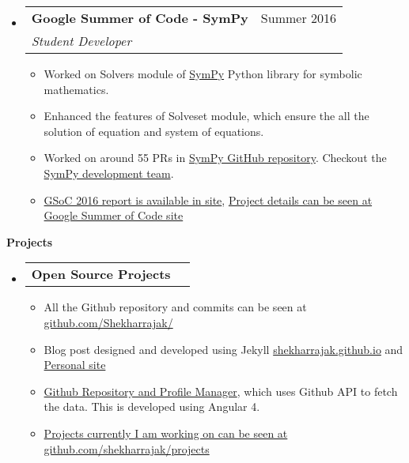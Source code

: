 \documentclass[letterpaper,12pt]{article}[leftmargin=*]
\makeatletter
\def \entryspacing {-0pt}
\renewcommand{\section}[2]{\vspace{5pt}
  \colorbox{secondary}{\color{white}\raggedbottom\normalsize\textbf{{#1}{\hspace{7pt}#2}}}
}
\newcommand{\resumeEntryStart}{\begin{itemize}[leftmargin=2.5mm]}
\newcommand{\resumeEntryEnd}{\end{itemize}\vspace{\entryspacing}}
\newcommand{\resumeItemListStart}{\begin{itemize}[leftmargin=4.5mm]}
\newcommand{\resumeItemListEnd}{\end{itemize}}
\newcommand{\resumeItem}[1]{
  \item\small{
    {#1 \vspace{-2pt}}
  }
}
\newcommand{\resumeEntryTSDL}[4]{
  \vspace{-1pt}\item[]
    \begin{tabular*}{0.97\textwidth}{l@{\extracolsep{\fill}}r}
      \textbf{\color{primary}#1} & {\firabook\color{accent}\small#2} \\
      \textit{\color{accent}\small#3} & \textit{\color{accent}\small#4} \\
    \end{tabular*}\vspace{-6pt}
}
\newcommand{\resumeEntryTD}[2]{
  \vspace{-1pt}\item[]
    \begin{tabular*}{0.97\textwidth}{l@{\extracolsep{\fill}}r}
      \textbf{\color{primary}#1} & {\firabook\color{accent}\small#2} \\
    \end{tabular*}\vspace{-6pt}
}
\makeatother
\begin{document}
  \resumeEntryStart
    \resumeEntryTSDL
      {Google Summer of Code - SymPy}{Summer 2016}
      {Student Developer}{}
    \resumeItemListStart
      \resumeItem {Worked on Solvers module of \href{https://github.com/sympy/sympy}{SymPy}  Python library for symbolic mathematics.}
      \resumeItem {Enhanced the features of Solveset module, which ensure the all the solution of equation and system of equations.}
      \resumeItem {Worked on around 55 PRs in \href{https://github.com/sympy/sympy/pulls/Shekharrajak}{SymPy GitHub repository}. Checkout the \href{https://docs.sympy.org/latest/aboutus.html#sympy-development-team}{SymPy development team}.}
      \resumeItem {\href{https://shekharrajak.github.io/gsoc_2016_posts/}{GSoC 2016 report is available in site}, \href{https://summerofcode.withgoogle.com/archive/2016/projects/6728916672708608/}{Project details can be seen at Google Summer of Code site}}
    \resumeItemListEnd
  \resumeEntryEnd




\section{\faFlask}{Projects}

  \resumeEntryStart
    \resumeEntryTD
      {Open Source Projects}{}
    \resumeItemListStart
      \resumeItem {All the Github repository and commits can be seen at \href{https://github.com/Shekharrajak?tab=repositories}{github.com/Shekharrajak/}}

      \resumeItem {Blog post designed and developed using Jekyll \href{https://github.com/Shekharrajak/shekharrajak.github.io}{shekharrajak.github.io} and \href{http://s-hacker.info/}{Personal site} }

      \resumeItem { \href{https://github.com/Shekharrajak/GithubRepoManager}{Github Repository and Profile Manager}, which uses Github API to fetch the data. This is developed using Angular 4.}

      \resumeItem { \href{https://github.com/Shekharrajak?tab=projects}{Projects currently I am working on can be seen at github.com/shekharrajak/projects}}

    \resumeItemListEnd
  \resumeEntryEnd
\end{document}
